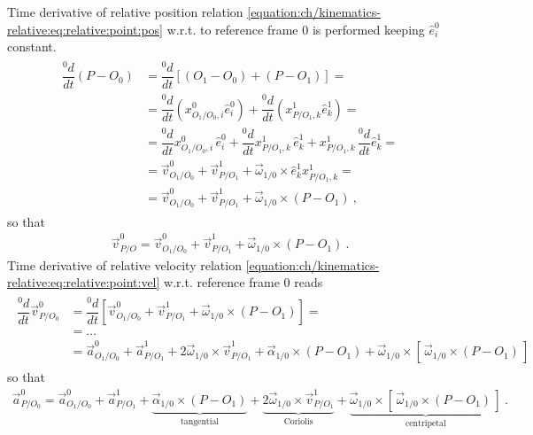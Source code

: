 \documentclass[letterpaper,10pt,english]{jupyterBook}
\begin{document}
\sphinxAtStartPar
{} Time derivative of relative position relation \eqref{equation:ch/kinematics-relative:eq:relative:point:pos} w.r.t. to reference frame \(0\) is performed keeping \(\hat{e}^0_i\) constant.
\begin{equation*}
\begin{split}\begin{aligned}
  \dfrac{{}^0 d}{dt} (P-O_0)
  & = \dfrac{{}^0 d}{dt} \left[ (O_1 - O_0) + (P - O_1) \right] = \\
  & = \dfrac{{}^0 d}{dt} \left( x^0_{O_1/O_0,i} \hat{e}^0_i  \right) + \dfrac{{}^0 d}{dt} \left( x^1_{P/O_1,k} \hat{e}^1_k \right) = \\
  & = \dfrac{{}^0 d}{dt} x^0_{O_1/O_0,i} \, \hat{e}^0_i + \dfrac{{}^0 d}{dt} x^1_{P/O_1,k} \, \hat{e}^1_k + x^1_{P/O_1,k} \, \dfrac{{}^0 d}{dt}  \hat{e}^1_k = \\
  & = \vec{v}^0_{O_1/O_0} + \vec{v}^1_{P/O_1} + \vec{\omega}_{1/0} \times  \hat{e}^1_k x^1_{P/O_1,k} = \\
  & = \vec{v}^0_{O_1/O_0} + \vec{v}^1_{P/O_1} + \vec{\omega}_{1/0} \times ( P - O_1 )  \ ,
\end{aligned}\end{split}
\end{equation*}
\sphinxAtStartPar
so that
\begin{equation}\label{equation:ch/kinematics-relative:eq:relative:point:vel}
\begin{split} \vec{v}^0_{P/O} = \vec{v}^0_{O_1/O_0} + \vec{v}^1_{P/O_1} + \vec{\omega}_{1/0} \times ( P - O_1 )  \ .\end{split}
\end{equation}
\sphinxAtStartPar
{} Time derivative of relative velocity relation \eqref{equation:ch/kinematics-relative:eq:relative:point:vel} w.r.t. reference frame \(0\) reads
\begin{equation*}
\begin{split}\begin{aligned}
  \dfrac{{}^0 d}{dt} \vec{v}^0_{P/O_0}
  & = \dfrac{{}^0 d}{dt} \left[ \vec{v}^0_{O_1/O_0} + \vec{v}^1_{P/O_1} + \vec{\omega}_{1/0} \times ( P - O_1 ) \right] = \\
  & = \dots \\
  & = \vec{a}^0_{O_1/O_0} + \vec{a}^{1}_{P/O_1} + 2 \vec{\omega}_{1/0} \times \vec{v}^1_{P/O_1} + \vec{\alpha}_{1/0} \times (P - O_1) + \vec{\omega}_{1/0} \times [ \, \vec{\omega}_{1/0} \times (P - O_1) \, ]
\end{aligned}\end{split}
\end{equation*}
\sphinxAtStartPar
so that
\begin{equation*}
\begin{split}
\vec{a}^0_{P/O_0} = \vec{a}^0_{O_1/O_0} + \vec{a}^{1}_{P/O_1} + \underbrace{\vec{\alpha}_{1/0} \times (P - O_1)}_{\text{tangential}} + \underbrace{2 \vec{\omega}_{1/0} \times \vec{v}^1_{P/O_1}}_{\text{Coriolis}} + \underbrace{\vec{\omega}_{1/0} \times [ \, \vec{\omega}_{1/0} \times (P - O_1) \, ]}_{\text{centripetal}} \ .
\end{split}
\end{equation*}
\end{document}
